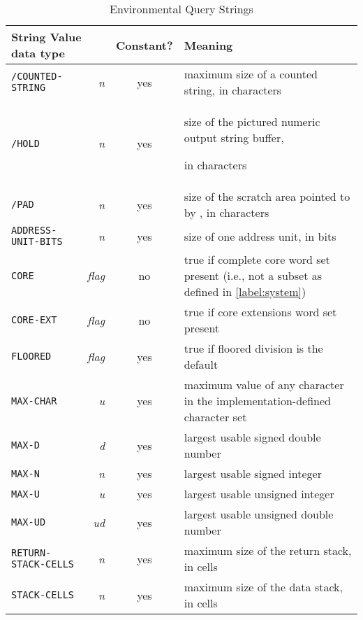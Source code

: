 \begin{table}[ht]
  \begin{center}
	\caption{Environmental Query Strings}
	\label{table:env}
	\begin{tabular}{p{9.5em}rcp{}}
		\hline\hline
		\multicolumn{2}{l}{String \hfill Value data type} & Constant? & Meaning \\
		\hline
		\texttt{/COUNTED-STRING}	& \emph{n}		& yes	&
			maximum size of a counted string, in characters \\
		\texttt{/HOLD}				& \emph{n}		& yes	&
			size of the pictured numeric output string buffer,

			in characters \\

		\texttt{/PAD}				& \emph{n}		& yes	&
			size of the scratch area pointed to by \word{PAD},
			in characters \\
		\texttt{ADDRESS-UNIT-BITS}	& \emph{n}		& yes	&
			size of one address unit, in bits \\
		\texttt{CORE}				& \emph{flag}	& no	&
			true if complete core word set present
			(i.e., not a subset as defined in \ref{label:system}) \\
		\texttt{CORE-EXT}			& \emph{flag}	& no	&
			true if core extensions word set present \\
		\texttt{FLOORED}			& \emph{flag}	& yes	&
			true if floored division is the default \\
		\texttt{MAX-CHAR}			& \emph{u}		& yes	&
			maximum value of any character in the
			imple\-mentation-defined character set \\
		\texttt{MAX-D}				& \emph{d}		& yes	&
			largest usable signed double number \\
		\texttt{MAX-N}				& \emph{n}		& yes	&
			largest usable signed integer \\
		\texttt{MAX-U}				& \emph{u}		& yes	&
			largest usable unsigned integer \\
		\texttt{MAX-UD}				& \emph{ud}		& yes	&
			largest usable unsigned double number \\
		\texttt{RETURN-STACK-CELLS}	& \emph{n}		& yes	&
			maximum size of the return stack, in cells \\
		\texttt{STACK-CELLS}		& \emph{n}		& yes	&
			maximum size of the data stack, in cells \\
		\hline\hline
	\end{tabular}
  \end{center}
\end{table}

